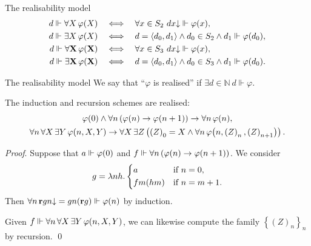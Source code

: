 \documentclass{beamer}
\newcommand{\tuple}[1]{\left\langle #1 \right\rangle}
\begin{document}
\begin{frame}{The realisability model}
\begin{align*}
    d \Vdash \forall X \, \varphi\mleft(X\mright)                   & \quad \Longleftrightarrow \quad        \forall x \in S_2 \ dx {\downarrow} \Vdash \varphi\mleft(x\mright),                                                 \\
    d \Vdash \exists X \, \varphi\mleft(X\mright)                   & \quad \Longleftrightarrow \quad     d = \tuple{d_0, d_1} \land d_0 \in S_2 \land d_1 \Vdash \varphi\mleft(d_0\mright),                                     \\
    d \Vdash \forall \mathbf{X} \, \varphi\mleft(\mathbf{X}\mright) & \quad \Longleftrightarrow \quad        \forall x \in S_3 \ dx {\downarrow} \Vdash \varphi\mleft(x\mright),                                                 \\
    d \Vdash \exists \mathbf{X} \, \varphi\mleft(\mathbf{X}\mright) & \quad \Longleftrightarrow \quad     d = \tuple{d_0, d_1} \land d_0 \in S_3 \land d_1 \Vdash \varphi\mleft(d_0\mright).
  \end{align*}
\end{frame}

\begin{frame}{The realisability model}
  We say that ``$\varphi$ is realised'' if $\exists d \in \mathbb{N} \ d \Vdash \varphi$.

  \begin{lemma}
    The induction and recursion schemes are realised:
    \begin{gather*}
      \varphi\mleft(0\mright) \land \forall n \left(\varphi\mleft(n\mright) \rightarrow \varphi\mleft(n + 1\mright)\right) \rightarrow \forall n \, \varphi\mleft(n\mright), \\
      \forall n \, \forall X \, \exists Y \, \varphi\mleft(n, X, Y\mright) \rightarrow \forall X \, \exists Z \left(\left(Z\right)_0 = X \land \forall n \, \varphi\mleft(n, \left(Z\right)_n, \left(Z\right)_{n + 1}\mright)\right).
    \end{gather*}
  \end{lemma}

  \emph{Proof}. Suppose that $a \Vdash \varphi\mleft(0\mright)$ and $f \Vdash \forall n \left(\varphi\mleft(n\mright) \rightarrow \varphi\mleft(n + 1\mright)\right)$. We consider
  \[g = \lambda nh. \left\{\begin{aligned}
       & a                    &  & \text{if $n = 0$},     \\
       & fm \mleft(hm\mright) &  & \text{if $n = m + 1$}.
    \end{aligned}\right.\]
  Then $\forall n \, \mathbf{r} gn {\downarrow} = gn \mleft(\mathbf{r} g\mright) \Vdash \varphi\mleft(n\mright)$ by induction.

  \vspace{0.6em}

  Given $f \Vdash \forall n \, \forall X \, \exists Y \, \varphi\mleft(n, X, Y\mright)$, we can likewise compute the family $\left\{\left(Z\right)_n\right\}_n$ by recursion. \qed
\end{frame}
\end{document}
